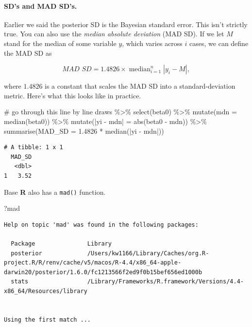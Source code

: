 \documentclass[
  letterpaper,
  DIV=11,
  numbers=noendperiod]{scrartcl}
\let\oldparagraph\paragraph
\renewcommand{\paragraph}[1]{\oldparagraph{#1}\mbox{}}
\newenvironment{Shaded}{\begin{snugshade}}{\end{snugshade}}
\newcommand{\AttributeTok}[1]{\textcolor[rgb]{0.40,0.45,0.13}{#1}}
\newcommand{\CommentTok}[1]{\textcolor[rgb]{0.37,0.37,0.37}{#1}}
\newcommand{\FloatTok}[1]{\textcolor[rgb]{0.68,0.00,0.00}{#1}}
\newcommand{\FunctionTok}[1]{\textcolor[rgb]{0.28,0.35,0.67}{#1}}
\newcommand{\NormalTok}[1]{\textcolor[rgb]{0.00,0.23,0.31}{#1}}
\newcommand{\OtherTok}[1]{\textcolor[rgb]{0.00,0.23,0.31}{#1}}
\newcommand{\SpecialCharTok}[1]{\textcolor[rgb]{0.37,0.37,0.37}{#1}}
\newcommand{\StringTok}[1]{\textcolor[rgb]{0.13,0.47,0.30}{#1}}
\begin{document}
\paragraph{SD's and MAD SD's.}\label{sds-and-mad-sds.}

Earlier we said the posterior SD is the Bayesian standard error. This
isn't strictly true. You can also use the \emph{median absolute
deviation} (MAD SD). If we let \(M\) stand for the median of some
variable \(y\), which varies across \(i\) cases, we can define the MAD
SD as

\[
\textit{MAD SD} = 1.4826 \times \operatorname{median}_{i = 1}^n |y_i - M|,
\]

where \(1.4826\) is a constant that scales the MAD SD into a
standard-deviation metric. Here's what this looks like in practice.

\begin{Shaded}
\begin{Highlighting}[]
\CommentTok{\# go through this line by line}
\NormalTok{draws }\SpecialCharTok{\%\textgreater{}\%} 
  \FunctionTok{select}\NormalTok{(beta0) }\SpecialCharTok{\%\textgreater{}\%} 
  \FunctionTok{mutate}\NormalTok{(}\AttributeTok{mdn =} \FunctionTok{median}\NormalTok{(beta0)) }\SpecialCharTok{\%\textgreater{}\%} 
  \FunctionTok{mutate}\NormalTok{(}\StringTok{\textasciigrave{}}\AttributeTok{|yi {-} mdn|}\StringTok{\textasciigrave{}} \OtherTok{=} \FunctionTok{abs}\NormalTok{(beta0 }\SpecialCharTok{{-}}\NormalTok{ mdn)) }\SpecialCharTok{\%\textgreater{}\%} 
  \FunctionTok{summarise}\NormalTok{(}\AttributeTok{MAD\_SD =} \FloatTok{1.4826} \SpecialCharTok{*} \FunctionTok{median}\NormalTok{(}\StringTok{\textasciigrave{}}\AttributeTok{|yi {-} mdn|}\StringTok{\textasciigrave{}}\NormalTok{))}
\end{Highlighting}
\end{Shaded}

\begin{verbatim}
# A tibble: 1 x 1
  MAD_SD
   <dbl>
1   3.52
\end{verbatim}

Base \textbf{R} also has a \texttt{mad()} function.

\begin{Shaded}
\begin{Highlighting}[]
\NormalTok{?mad}
\end{Highlighting}
\end{Shaded}

\begin{verbatim}
Help on topic 'mad' was found in the following packages:

  Package               Library
  posterior             /Users/kw1166/Library/Caches/org.R-project.R/R/renv/cache/v5/macos/R-4.4/x86_64-apple-darwin20/posterior/1.6.0/fc1213566f2ed9f0b15bef656ed1000b
  stats                 /Library/Frameworks/R.framework/Versions/4.4-x86_64/Resources/library


Using the first match ...
\end{verbatim}
\end{document}

